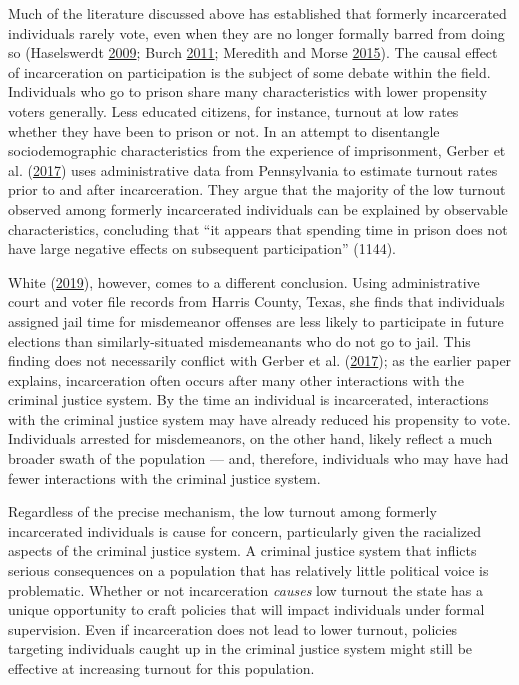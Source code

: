 \documentclass[12pt,]{article}
\begin{document}
Much of the literature discussed above has established that formerly incarcerated individuals rarely vote, even when they are no longer formally barred from doing so (Haselswerdt \protect\hyperlink{ref-Haselswerdt2009}{2009}; Burch \protect\hyperlink{ref-Burch2011}{2011}; Meredith and Morse \protect\hyperlink{ref-Meredith2015}{2015}). The causal effect of incarceration on participation is the subject of some debate within the field. Individuals who go to prison share many characteristics with lower propensity voters generally. Less educated citizens, for instance, turnout at low rates whether they have been to prison or not. In an attempt to disentangle sociodemographic characteristics from the experience of imprisonment, Gerber et al. (\protect\hyperlink{ref-Gerber2017}{2017}) uses administrative data from Pennsylvania to estimate turnout rates prior to and after incarceration. They argue that the majority of the low turnout observed among formerly incarcerated individuals can be explained by observable characteristics, concluding that ``it appears that spending time in prison does not have large negative effects on subsequent participation'' (1144).

White (\protect\hyperlink{ref-White2019}{2019}), however, comes to a different conclusion. Using administrative court and voter file records from Harris County, Texas, she finds that individuals assigned jail time for misdemeanor offenses are less likely to participate in future elections than similarly-situated misdemeanants who do not go to jail. This finding does not necessarily conflict with Gerber et al. (\protect\hyperlink{ref-Gerber2017}{2017}); as the earlier paper explains, incarceration often occurs after many other interactions with the criminal justice system. By the time an individual is incarcerated, interactions with the criminal justice system may have already reduced his propensity to vote. Individuals arrested for misdemeanors, on the other hand, likely reflect a much broader swath of the population --- and, therefore, individuals who may have had fewer interactions with the criminal justice system.

Regardless of the precise mechanism, the low turnout among formerly incarcerated individuals is cause for concern, particularly given the racialized aspects of the criminal justice system. A criminal justice system that inflicts serious consequences on a population that has relatively little political voice is problematic. Whether or not incarceration \emph{causes} low turnout the state has a unique opportunity to craft policies that will impact individuals under formal supervision. Even if incarceration does not lead to lower turnout, policies targeting individuals caught up in the criminal justice system might still be effective at increasing turnout for this population.
\end{document}
